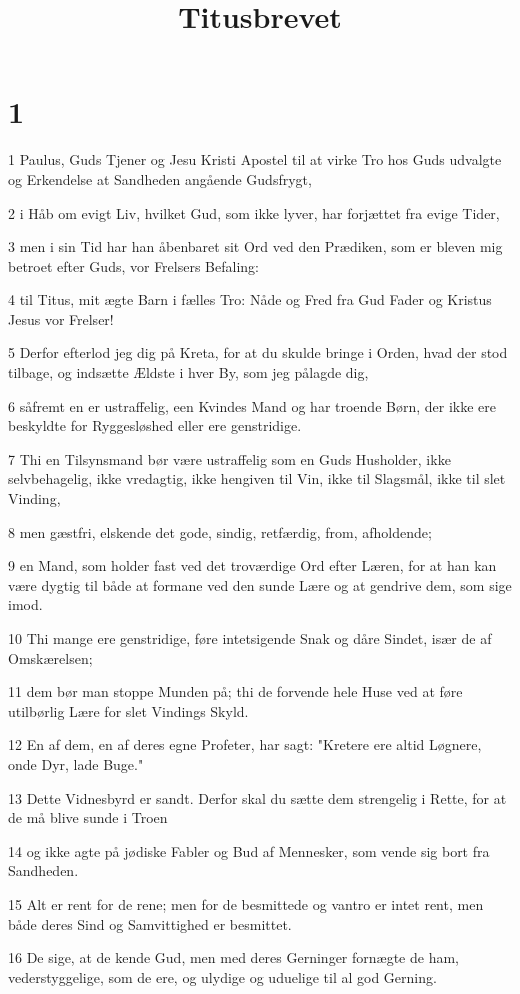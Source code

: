 

\title{Titusbrevet}


\chapter{1}

\par 1 Paulus, Guds Tjener og Jesu Kristi Apostel til at virke Tro hos Guds udvalgte og Erkendelse at Sandheden angående Gudsfrygt,
\par 2 i Håb om evigt Liv, hvilket Gud, som ikke lyver, har forjættet fra evige Tider,
\par 3 men i sin Tid har han åbenbaret sit Ord ved den Prædiken, som er bleven mig betroet efter Guds, vor Frelsers Befaling:
\par 4 til Titus, mit ægte Barn i fælles Tro: Nåde og Fred fra Gud Fader og Kristus Jesus vor Frelser!
\par 5 Derfor efterlod jeg dig på Kreta, for at du skulde bringe i Orden, hvad der stod tilbage, og indsætte Ældste i hver By, som jeg pålagde dig,
\par 6 såfremt en er ustraffelig, een Kvindes Mand og har troende Børn, der ikke ere beskyldte for Ryggesløshed eller ere genstridige.
\par 7 Thi en Tilsynsmand bør være ustraffelig som en Guds Husholder, ikke selvbehagelig, ikke vredagtig, ikke hengiven til Vin, ikke til Slagsmål, ikke til slet Vinding,
\par 8 men gæstfri, elskende det gode, sindig, retfærdig, from, afholdende;
\par 9 en Mand, som holder fast ved det troværdige Ord efter Læren, for at han kan være dygtig til både at formane ved den sunde Lære og at gendrive dem, som sige imod.
\par 10 Thi mange ere genstridige, føre intetsigende Snak og dåre Sindet, især de af Omskærelsen;
\par 11 dem bør man stoppe Munden på; thi de forvende hele Huse ved at føre utilbørlig Lære for slet Vindings Skyld.
\par 12 En af dem, en af deres egne Profeter, har sagt: "Kretere ere altid Løgnere, onde Dyr, lade Buge."
\par 13 Dette Vidnesbyrd er sandt. Derfor skal du sætte dem strengelig i Rette, for at de må blive sunde i Troen
\par 14 og ikke agte på jødiske Fabler og Bud af Mennesker, som vende sig bort fra Sandheden.
\par 15 Alt er rent for de rene; men for de besmittede og vantro er intet rent, men både deres Sind og Samvittighed er besmittet.
\par 16 De sige, at de kende Gud, men med deres Gerninger fornægte de ham, vederstyggelige, som de ere, og ulydige og uduelige til al god Gerning.

